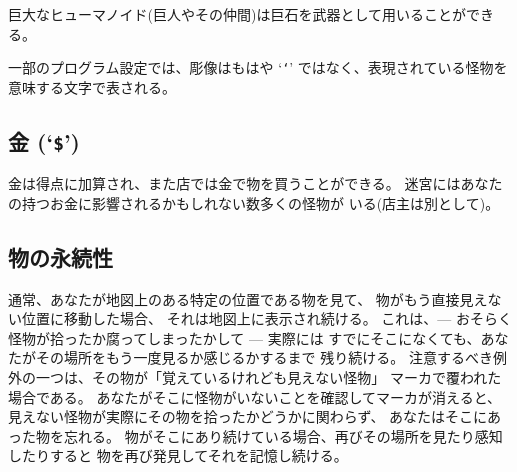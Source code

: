 巨大なヒューマノイド(巨人やその仲間)は巨石を武器として用いることができる。

一部のプログラム設定では、彫像はもはや
`{\tt `}'
ではなく、表現されている怪物を意味する文字で表される。

\subsection*{金 (`{\tt \$}')}

金は得点に加算され、また店では金で物を買うことができる。
迷宮にはあなたの持つお金に影響されるかもしれない数多くの怪物が
いる(店主は別として)。

\subsection*{物の永続性}

通常、あなたが地図上のある特定の位置である物を見て、
物がもう直接見えない位置に移動した場合、
それは地図上に表示され続ける。
これは、--- おそらく怪物が拾ったか腐ってしまったかして --- 実際には
すでにそこになくても、あなたがその場所をもう一度見るか感じるかするまで
残り続ける。
注意するべき例外の一つは、その物が「覚えているけれども見えない怪物」
マーカで覆われた場合である。
あなたがそこに怪物がいないことを確認してマーカが消えると、
見えない怪物が実際にその物を拾ったかどうかに関わらず、
あなたはそこにあった物を忘れる。
物がそこにあり続けている場合、再びその場所を見たり感知したりすると
物を再び発見してそれを記憶し続ける。

